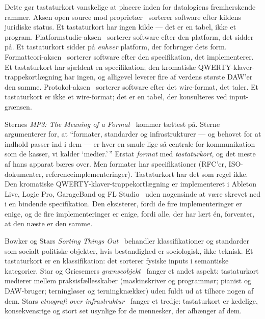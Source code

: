 \documentclass[10pt,letterpaper,twocolumn]{article}
\begin{document}
Dette gør tastaturkort vanskelige at placere inden for datalogiens fremherskende rammer. Aksen open source mod proprietær~\citep{galloway2004protocol} sorterer software efter kildens juridiske status. Et tastaturkort har ingen kilde --- det er en tabel, ikke et program. Platformstudie-aksen~\citep{nieborg2018platformization} sorterer software efter den platform, det sidder på. Et tastaturkort sidder på \emph{enhver} platform, der forbruger dets form. Formatteori-aksen~\citep{sterne2012mp3} sorterer software efter den specifikation, det implementerer. Et tastaturkort har sjældent en specifikation; den kromatiske QWERTY-klaver-trappekortlægning har ingen, og alligevel leverer fire af verdens største DAW'er den samme. Protokol-aksen~\citep{galloway2004protocol} sorterer software efter det wire-format, det taler. Et tastaturkort er ikke et wire-format; det er en tabel, der konsulteres ved input-grænsen.

Sternes \emph{MP3: The Meaning of a Format}~\citep{sterne2012mp3} kommer tættest på. Sterne argumenterer for, at ``formater, standarder og infrastrukturer --- og behovet for at indhold passer ind i dem --- er hver en smule lige så centrale for kommunikation som de kasser, vi kalder `medier.'\,'' Erstat \emph{format} med \emph{tastaturkort}, og det meste af hans apparat bæres over. Men formater har specifikationer (RFC'er, ISO-dokumenter, referenceimplementeringer). Tastaturkort har det som regel ikke. Den kromatiske QWERTY-klaver-trappekortlægning er implementeret i Ableton Live, Logic Pro, GarageBand og FL Studio~\citep{ableton_musical_typing,apple_logic_musicaltyping,imageline_typing_piano} uden nogensinde at være skrevet ned i en bindende specifikation. Den eksisterer, fordi de fire implementeringer er enige, og de fire implementeringer er enige, fordi alle, der har lært én, forventer, at den næste er den samme.

Bowker og Stars \emph{Sorting Things Out}~\citep{bowker1999sorting} behandler klassifikationer og standarder som socialt-politiske objekter, hvis bestandighed er sociologisk, ikke teknisk. Et tastaturkort er en klassifikation: det sorterer fysiske inputs i semantiske kategorier. Star og Griesemers \emph{grænseobjekt}~\citep{star1989boundary} fanger et andet aspekt: tastaturkort medierer mellem praksisfællesskaber (maskinskriver og programmør; pianist og DAW-bruger; terningløser og terningknækker) uden fuldt ud at tilhøre nogen af dem. Stars \emph{etnografi over infrastruktur}~\citep{star1999ethnography} fanger et tredje: tastaturkort er kedelige, konsekvensrige og stort set usynlige for de mennesker, der afhænger af dem.
\end{document}
